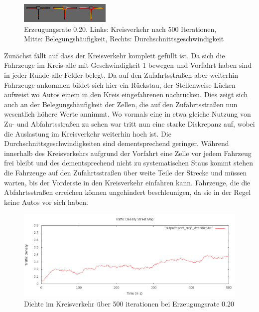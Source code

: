 \documentclass[10pt, a4paper]{article}
\begin{document}
\begin{figure}[h!]
	\centering
	\includegraphics[width=\textwidth]{img/roundabout_020}
	\caption{Erzeugungsrate 0.20. Links: Kreisverkehr nach 500 Iterationen, Mitte: Belegungshäufigkeit, Rechts: Durchschnittsgeschwindigkeit}
	\label{fig:roundabout020}
\end{figure}

Zunächst fällt auf dass der Kreisverkehr komplett gefüllt ist. Da sich die Fahrzeuge im Kreis alle mit Geschwindigkeit 1 bewegen und Vorfahrt haben sind in jeder Runde alle Felder belegt. Da auf den Zufahrtsstraßen aber weiterhin Fahrzeuge ankommen bildet sich hier ein Rückstau, der Stellenweise Lücken aufweist wo Autos einem in den Kreis eingefahrenen nachrücken. Dies zeigt sich auch an der Belegungshäufigkeit der Zellen, die auf den Zufahrtsstraßen nun wesentlich höhere Werte annimmt. Wo vormals eine in etwa gleiche Nutzung von Zu- und Abfahrtsstraßen zu sehen war tritt nun eine starke Diskrepanz auf, wobei die Auslastung im Kreisverkehr weiterhin hoch ist. Die Durchschnittsgeschwindigkeiten sind dementsprechend geringer. Während innerhalb des Kreisverkehrs aufgrund der Vorfahrt eine Zelle vor jedem Fahrzeug frei bleibt und des dementsprechend nicht zu systematischen Staus kommt stehen die Fahrzeuge auf den Zufahrtsstraßen über weite Teile der Strecke und müssen warten, bis der Vorderste in den Kreisverkehr einfahren kann. Fahrzeuge, die die Abfahrtsstraßen erreichen können ungehindert beschleunigen, da sie in der Regel keine Autos vor sich haben.

\begin{figure}[h!]
	\centering
	\includegraphics[width=\textwidth]{img/roundabout_020_densities}
	\caption{Dichte im Kreisverkehr über 500 iterationen bei Erzeugungsrate 0.20}
	\label{fig:roundabout020density}
\end{figure}
\end{document}

